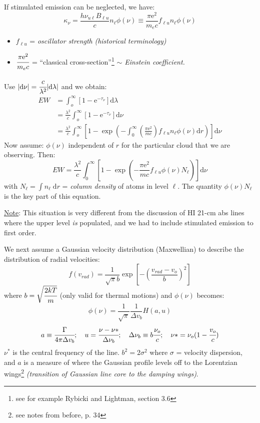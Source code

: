 \documentclass[12pt]{article}
\newcommand{\mar}[1]{\hspace{0pt}\marginpar{-\textcolor{black}{#1}-}}
\newcommand{\mynotes}[1]{{\fontfamily{cmss}\selectfont \textit{#1}}}
\begin{document}
If stimulated emission can be neglected, we have:
\[
    \kappa_{\nu} = \frac{h\nu_{u\ell}B_{\ell{u}}}{c}n_{\ell}\phi(\nu) \equiv
    \frac{\pi\mathrm{e}^{2}}{m_{e}c}f_{\ell{u}}n_{\ell}\phi(\nu)
    \]
\begin{itemize}
    \item $f_{\ell{u}}$ = \emph{oscillator strength}
        \mynotes{(historical terminology)}
    \item $\cfrac{\pi\mathrm{e}^{2}}{m_{e}c}$
        = ``classical cross-section''\footnote{
            see for example Rybicki and Lightman, section 3.6}
        \mynotes{$\sim$ Einstein coefficient.}
\end{itemize}

Use
$\vert\mathrm{d}\nu\vert = \cfrac{c}{\lambda^{2}}\vert\mathrm{d}{\lambda}\vert$
and we obtain:
\begin{align*}
    EW
    &= \int_{o}^{\infty}{
        \left[ 1 - \mathrm{e}^{-\tau_{\nu}} \right] \mathrm{d}\lambda}\\
    &= \frac{\lambda^{2}}{c}\int_{o}^{\infty}{
        \left[1-\mathrm{e}^{-\tau_{\nu}}\right]\mathrm{d}\nu} \\
    &= \frac{\lambda^{2}}{c}\int_{o}^{\infty}{
        \left[ 1 - \exp \left(
        -\int_{0}^{\infty}{
            \left( \frac{\pi\mathrm{e}^{2}}{mc} \right)
            f_{\ell{u}}n_{\ell}\phi(\nu)\mathrm{d}r} \right) \right] \mathrm{d}\nu }
\end{align*}
Now assume: $\phi(\nu)$ independent of $r$ for the particular cloud
that we are observing. Then:
$${
    EW = \frac{\lambda^{2}}{c}\int_{0}^{\infty}{
        \left[ 1 - \exp \left(
        -\frac{\pi\mathrm{e}^{2}}{mc}
        f_{\ell{u}} \phi (\nu) N_{\ell} \right) \right] \mathrm{d}\nu}
}$$
with $N_{\ell} = \int{n_{\ell}\;\mathrm{d}r}$ = \emph{column density}
of atoms in level $\ell$. The quantity $\phi(\nu)N_{\ell}$ is the key
part of this equation.

\mar{92}\underline{Note}: This situation is very different from the
discussion of HI 21-cm abs lines where the upper level \emph{is}
populated, and we had to include stimulated emission to first order.

We next assume a Gaussian velocity distribution (Maxwellian) to
describe the distribution of radial velocities:
\[
    f(v_{rad}) = \frac{1}{\sqrt{\pi}b}\exp  \left[
        - \left( \frac{v_{rad}-v_{o}}{b} \right) ^{2}\right]
    \]
where $b = \sqrt{\cfrac{2kT}{m}}$ (only valid for thermal motions)
and $\phi(\nu)$ becomes:
\[
    \phi(\nu) = \frac{1}{\sqrt{\pi}}\frac{1}{\Delta{v_{b}}}H(a,u)
    \]
\[
    a \equiv \cfrac{\Gamma}{4\pi\Delta{v_{b}}}; \quad
    u = \cfrac{\nu-\nu*}{\Delta\nu_{b}}; \quad
    \Delta\nu_{b} \equiv b\cfrac{\nu_{o}}{c}; \quad
    \nu* = \nu_{o}(1-\cfrac{v_{o}}{c})
    \]
$\nu^{*}$ is the central frequency of the line.
$b^{2} = 2\sigma^{2}$ where $\sigma$ = velocity dispersion, and $a$ is
a measure of where the Gaussian profile levels off to the Lorentzian
wings\footnote{see notes from before, p. 34}
\mynotes{(transition of Gaussian line core to the damping wings)}.
\end{document}
